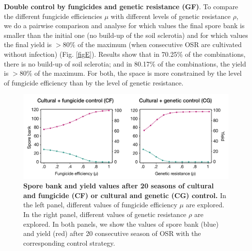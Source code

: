\documentclass{article}
\begin{document}
\textbf{Double control by fungicides and genetic resistance (GF)}. To compare the different fungicide efficiencies $\mu$ with different levels of genetic resistance $\rho$, we do a pairwise comparison and analyse for which values the final spore bank is smaller than the initial one (no build-up of the soil sclerotia) and for which values the final yield is $>80\%$ of the maximum (when consecutive OSR are cultivated without infection) (Fig. \ref{figE}). Results show that in 70.25\% of the combinations, there is no build-up of soil sclerotia; and in 80.17\% of the combinations, the yield is $>80\%$ of the maximum. For both, the space is more constrained by the level of fungicide efficiency than by the level of genetic resistance. 

\begin{figure}
 \includegraphics[width=\columnwidth]{SCL_Fig/SCL_FigD.pdf}
\caption{\label{fig:figD}\textbf{Spore bank and yield values after 20 seasons of cultural and fungicide (CF) or cultural and genetic (CG) control.} In the left panel, different values of fungicide efficiency $\mu$ are explored. In the right panel, different values of genetic resistance $\rho$ are explored. In both panels, we show the values of spore bank (blue) and yield (red) after 20 consecutive season of OSR with the corresponding control strategy. }
\end{figure}
\end{document}
